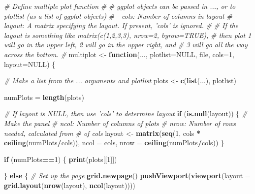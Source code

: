 \documentclass[]{article}
\newenvironment{Shaded}{\begin{snugshade}}{\end{snugshade}}
\newcommand{\CommentTok}[1]{\textcolor[rgb]{0.56,0.35,0.01}{\textit{#1}}}
\newcommand{\ControlFlowTok}[1]{\textcolor[rgb]{0.13,0.29,0.53}{\textbf{#1}}}
\newcommand{\DataTypeTok}[1]{\textcolor[rgb]{0.13,0.29,0.53}{#1}}
\newcommand{\DecValTok}[1]{\textcolor[rgb]{0.00,0.00,0.81}{#1}}
\newcommand{\KeywordTok}[1]{\textcolor[rgb]{0.13,0.29,0.53}{\textbf{#1}}}
\newcommand{\NormalTok}[1]{#1}
\newcommand{\OperatorTok}[1]{\textcolor[rgb]{0.81,0.36,0.00}{\textbf{#1}}}
\newcommand{\OtherTok}[1]{\textcolor[rgb]{0.56,0.35,0.01}{#1}}
\newcommand{\StringTok}[1]{\textcolor[rgb]{0.31,0.60,0.02}{#1}}
\begin{document}
\begin{Shaded}
\begin{Highlighting}[]
\CommentTok{# Define multiple plot function}
\CommentTok{#}
\CommentTok{# ggplot objects can be passed in ..., or to plotlist (as a list of ggplot objects)}
\CommentTok{# - cols:   Number of columns in layout}
\CommentTok{# - layout: A matrix specifying the layout. If present, 'cols' is ignored.}
\CommentTok{#}
\CommentTok{# If the layout is something like matrix(c(1,2,3,3), nrow=2, byrow=TRUE),}
\CommentTok{# then plot 1 will go in the upper left, 2 will go in the upper right, and}
\CommentTok{# 3 will go all the way across the bottom.}
\CommentTok{#}
\NormalTok{multiplot <-}\StringTok{ }\ControlFlowTok{function}\NormalTok{(..., }\DataTypeTok{plotlist=}\OtherTok{NULL}\NormalTok{, file, }\DataTypeTok{cols=}\DecValTok{1}\NormalTok{, }\DataTypeTok{layout=}\OtherTok{NULL}\NormalTok{) \{}

  \CommentTok{# Make a list from the ... arguments and plotlist}
\NormalTok{  plots <-}\StringTok{ }\KeywordTok{c}\NormalTok{(}\KeywordTok{list}\NormalTok{(...), plotlist)}

\NormalTok{  numPlots =}\StringTok{ }\KeywordTok{length}\NormalTok{(plots)}

  \CommentTok{# If layout is NULL, then use 'cols' to determine layout}
  \ControlFlowTok{if}\NormalTok{ (}\KeywordTok{is.null}\NormalTok{(layout)) \{}
    \CommentTok{# Make the panel}
    \CommentTok{# ncol: Number of columns of plots}
    \CommentTok{# nrow: Number of rows needed, calculated from # of cols}
\NormalTok{    layout <-}\StringTok{ }\KeywordTok{matrix}\NormalTok{(}\KeywordTok{seq}\NormalTok{(}\DecValTok{1}\NormalTok{, cols }\OperatorTok{*}\StringTok{ }\KeywordTok{ceiling}\NormalTok{(numPlots}\OperatorTok{/}\NormalTok{cols)),}
                    \DataTypeTok{ncol =}\NormalTok{ cols, }\DataTypeTok{nrow =} \KeywordTok{ceiling}\NormalTok{(numPlots}\OperatorTok{/}\NormalTok{cols))}
\NormalTok{  \}}

 \ControlFlowTok{if}\NormalTok{ (numPlots}\OperatorTok{==}\DecValTok{1}\NormalTok{) \{}
    \KeywordTok{print}\NormalTok{(plots[[}\DecValTok{1}\NormalTok{]])}

\NormalTok{  \} }\ControlFlowTok{else}\NormalTok{ \{}
    \CommentTok{# Set up the page}
    \KeywordTok{grid.newpage}\NormalTok{()}
    \KeywordTok{pushViewport}\NormalTok{(}\KeywordTok{viewport}\NormalTok{(}\DataTypeTok{layout =} \KeywordTok{grid.layout}\NormalTok{(}\KeywordTok{nrow}\NormalTok{(layout), }\KeywordTok{ncol}\NormalTok{(layout))))}


\end{Highlighting}
\end{Shaded}
\end{document}
